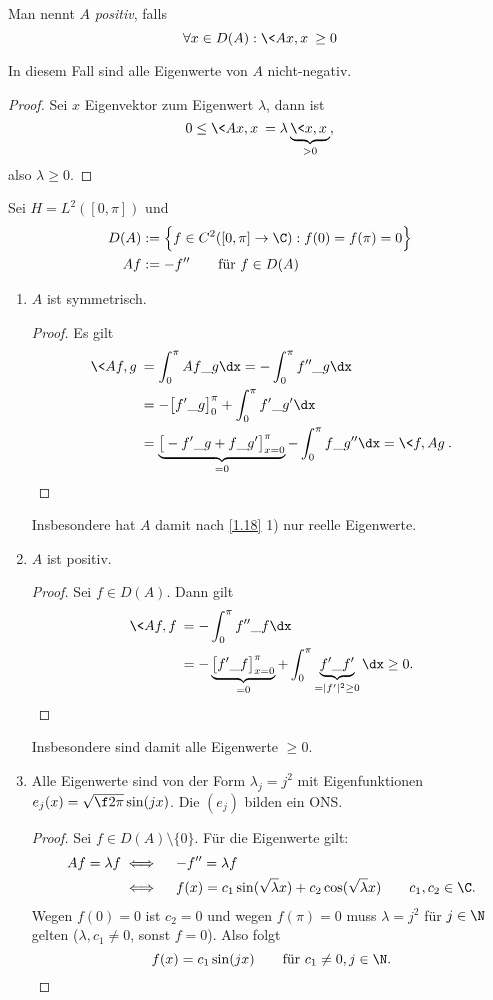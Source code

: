 \begin{df*}
	Man nennt $A$ \emph{positiv}, falls
	\[
		\forall x \in D(A) : \<Ax,x\> \ge 0
	\]
	\begin{note}
		In diesem Fall sind alle Eigenwerte von $A$ nicht-negativ.
		\begin{proof}
			Sei $x$ Eigenvektor zum Eigenwert $\lambda$, dann ist
			\[
				0 \le \<Ax,x\>
				= \lambda \underbrace{\<x,x\>}_{>0},
			\]
			also $\lambda \ge 0$.
		\end{proof}
	\end{note}
\end{df*}

\begin{ex} \label{1.21}
	Sei $H = L^2([0,\pi])$ und
	\begin{align*}
		D(A) &:= \Big\{ f \in C^2 ([0,\pi] \to \C) : f(0) = f(\pi) = 0 \Big\} \\
		Af &:= -f'' \qquad \text{für } f \in D(A)
	\end{align*}
	\begin{enumerate}[1)]
		\item
			$A$ ist symmetrisch.
			\begin{proof}
			Es gilt
				\begin{align*}
					\<Af, g\>
					&= \int_0^{\pi} Af \_g \dx
					= - \int_0^{\pi} f'' \_g \dx \\
					&= -\big[ f'\_{g} \big]_{0}^\pi + \int_{0}^\pi f'\_{g'} \dx \\
					&= \underbrace{\big[ - f'\_g + f \_g' \big]_{x=0}^\pi}_{=0} - \int_0^\pi f \_g'' \dx
					= \<f, Ag\>.
				\end{align*}
			\end{proof}
			Insbesondere hat $A$ damit nach \ref{1.18} 1) nur reelle Eigenwerte.
		\item
			$A$ ist positiv.
			\begin{proof}
				Sei $f \in D(A)$.
				Dann gilt
				\begin{align*}
					\<Af,f\>
					&= - \int_0^\pi f'' \_f \dx \\
					&= - \underbrace{\big[f' \_f \big]_{x=0}^\pi}_{=0} + \int_0^\pi \underbrace{f' \_f'}_{= |f'|^2 \ge 0} \dx
					\ge 0.
				\end{align*}
			\end{proof}
			Insbesondere sind damit alle Eigenwerte $\ge 0$.
		\item
			Alle Eigenwerte sind von der Form $\lambda_j = j^2$ mit Eigenfunktionen $e_j(x) = \sqrt{\f 2 \pi} \sin (jx)$.
			Die $(e_j)$ bilden ein ONS.
			\begin{proof}
				Sei $f \in D(A) \setminus \{0\}$.
				Für die Eigenwerte gilt:
				\begin{align*}
					Af = \lambda f
					&\iff\quad -f'' = \lambda f \\
					&\iff\quad f(x) = c_1 \sin(\sqrt \lambda x) + c_2 \cos (\sqrt \lambda x) \qquad c_1,c_2 \in \C.
				\end{align*}
				Wegen $f(0)=0$ ist $c_2 = 0$ und wegen $f(\pi) = 0$ muss $\lambda = j^2$ für $j\in \N$ gelten ($\lambda, c_1 \neq 0$, sonst $f = 0$).
				Also folgt
				\[
					f(x) = c_1 \sin(j x) \qquad  \text{für $c_1 \neq 0, j \in \N$.}
				\]


\end{proof}
\end{enumerate}
\end{ex}
